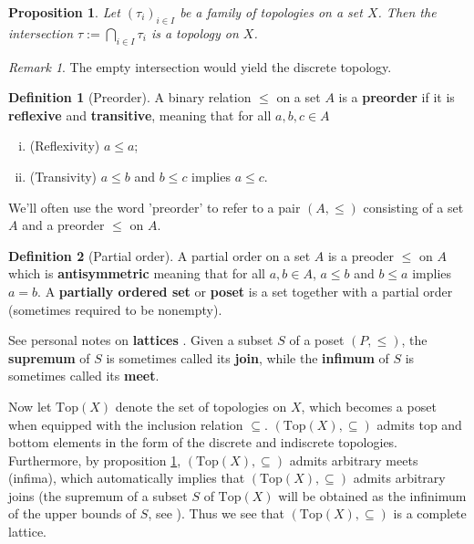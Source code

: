 \documentclass[a4paper,12pt,parskip=half*,chapterprefix=true,numbers=noendperiod]{scrreprt}
\newtheorem{proposition}{Proposition}[section]
\theoremstyle{definition}
\newtheorem{definition}{Definition}[section]
\theoremstyle{remark}
\newtheorem*{remark}{Remark}
\begin{document}
\begin{proposition}\label{prop:TopStableInt}
	Let $(\tau_i)_{i\in I}$ be a family of topologies on a set $X$. Then the intersection $\tau:=\bigcap_{i\in I}\tau_i$ is a topology on $X$.
\end{proposition}
\begin{remark}
	The empty intersection would yield the discrete topology.
\end{remark}

\begin{definition}[Preorder]
	A binary relation $\leq$ on a set $A$ is a \textbf{preorder} if it is \textbf{reflexive} and \textbf{transitive}, meaning that for all $a,b,c\in A$
	\begin{enumerate}[(i)]
		\item (Reflexivity) $a\leq a$;
		\item (Transivity) $a\leq b$ and $b\leq c$ implies $a\leq c$.
	\end{enumerate}
	We'll often use the word 'preorder' to refer to a pair $(A,\leq)$ consisting of a set $A$ and a preorder $\leq$ on $A$.
\end{definition}

\begin{definition}[Partial order]
	A partial order on a set $A$ is a preoder $\leq$ on $A$ which is \textbf{antisymmetric} meaning that for all $a,b\in A$, $a\leq b$ and $b\leq a$ implies $a=b$. A \textbf{partially ordered set} or \textbf{poset} is a set together with a partial order (sometimes required to be nonempty).
\end{definition}

See personal notes on \textbf{lattices} \cite{personal:Lattices}. Given a subset $S$ of a poset $(P,\leq)$, the \textbf{supremum} of $S$ is sometimes called its \textbf{join}, while the \textbf{infimum} of $S$ is sometimes called its \textbf{meet}.

Now let $\text{Top}(X)$ denote the set of topologies on $X$, which becomes a poset when equipped with the inclusion relation $\subseteq$. $(\text{Top}(X),\subseteq)$ admits top and bottom elements in the form of the discrete and indiscrete topologies. Furthermore, by proposition \ref{prop:TopStableInt}, $(\text{Top}(X),\subseteq)$ admits arbitrary meets (infima), which automatically implies that $(\text{Top}(X),\subseteq)$ admits arbitrary joins (the supremum of a subset $S$ of $\text{Top}(X)$ will be obtained as the infinimum of the upper bounds of $S$, see \cite{personal:Lattices}). Thus we see that $(\text{Top}(X),\subseteq)$ is a complete lattice.
\end{document}

